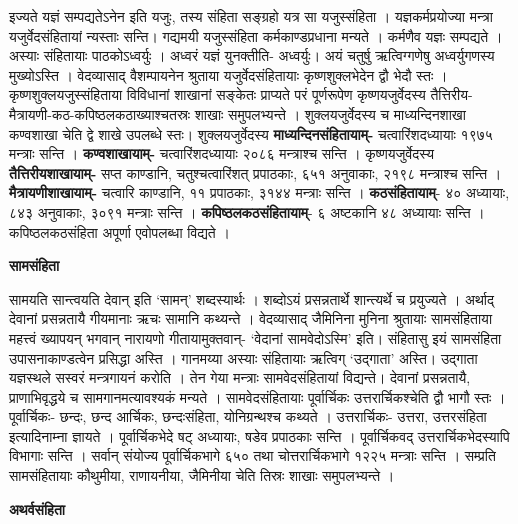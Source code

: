 \documentclass[11pt, a5paper]{article}
\newcommand{\customparagraph}[1]{
    \noindent \textbf{#1} \par
    \penalty 10000 %
    \vspace{0.1cm plus 0.05cm minus 0.02cm}
    \penalty 10000 %
}
\begin{document}
इज्यते यज्ञं सम्पद्यतेऽनेन इति यजुः, तस्य संहिता सङ्‌ग्रहो यत्र सा यजुस्संहिता । यज्ञकर्मप्रयोज्या मन्त्रा यजुर्वेदसंहितायां न्यस्ताः सन्ति। गद्यमयी यजुस्संहिता कर्मकाण्डप्रधाना मन्यते । कर्मणैव यज्ञः सम्पद्यते । अस्याः संहितायाः पाठकोऽध्वर्युः । अध्वरं यज्ञं युनक्तीति- अध्वर्युः। अयं चतुर्षु ऋत्विग्गणेषु अध्वर्युगणस्य मुख्योऽस्ति । वेदव्यासाद् वैशम्पायनेन श्रुताया यजुर्वेदसंहितायाः कृष्णशुक्लभेदेन द्वौ भेदौ स्तः । कृष्णशुक्लयजुस्संहिताया विविधानां शाखानां सङ्केतः प्राप्यते परं पूर्णरूपेण कृष्णयजुर्वेदस्य तैत्तिरीय-मैत्रायणी-कठ-कपिष्ठलकठाख्याश्चतस्रः शाखाः समुपलभ्यन्ते । शुक्लयजुर्वेदस्य च माध्यन्दिनशाखा कण्वशाखा चेति द्वे शाखे उपलब्धे स्तः।  शुक्लयजुर्वेदस्य \textbf{माध्यन्दिनसंहितायाम्-} चत्वारिंशदध्यायाः १९७५ मन्त्राः सन्ति । \textbf{कण्वशाखायाम्-} चत्वारिंशदध्यायाः २०८६ मन्त्राश्च सन्ति । कृष्णयजुर्वेदस्य \textbf{तैत्तिरीयशाखायाम्-} सप्त काण्डानि, चतुश्चत्वारिंशत् प्रपाठकाः, ६५१ अनुवाकाः, २१९८ मन्त्राश्च सन्ति । \textbf{मैत्रायणीशाखायाम्-} चत्वारि काण्डानि, ११ प्रपाठकाः, ३१४४ मन्त्राः सन्ति । \textbf{कठसंहितायाम्}- ४० अध्यायाः, ८४३ अनुवाकाः, ३०९१ मन्त्राः सन्ति । \textbf{कपिष्ठलकठसंहितायाम्}- ६ अष्टकानि ४८ अध्यायाः सन्ति । कपिष्ठलकठसंहिता अपूर्णा एवोपलब्धा विद्यते ।

\customparagraph{\textbf{सामसंहिता}}

सामयति सान्त्वयति देवान् इति ‘सामन्’ शब्दस्यार्थः । शब्दोऽयं प्रसन्नतार्थे शान्त्यर्थे च प्रयुज्यते । अर्थाद् देवानां प्रसन्नतायै गीयमानाः ऋचः सामानि कथ्यन्ते । वेदव्यासाद् जैमिनिना मुनिना श्रुतायाः सामसंहिताया महत्त्वं ख्यापयन् भगवान् नारायणो गीतायामुक्तवान्- ‘वेदानां सामवेदोऽस्मि’ इति। संहितासु इयं सामसंहिता उपासनाकाण्डत्वेन प्रसिद्धा अस्ति । गानमय्या अस्याः संहितायाः ऋत्विग् ‘उद्गाता’ अस्ति। उद्गाता यज्ञस्थले सस्वरं मन्त्रगायनं करोति । तेन गेया मन्त्राः सामवेदसंहितायां विद्यन्ते। देवानां प्रसन्नतायै, प्राणाभिवृद्धये च सामगानमत्यावश्यकं मन्यते । सामवेदसंहितायाः  पूर्वार्चिकः उत्तरार्चिकश्चेति द्वौ भागौ स्तः । पूर्वार्चिकः- छन्दः, छन्द आर्चिकः, छन्दःसंहिता, योनिग्रन्थश्च कथ्यते । उत्तरार्चिकः- उत्तरा, उत्तरसंहिता इत्यादिनाम्ना ज्ञायते । पूर्वार्चिकभेदे षट् अध्यायाः, षडेव प्रपाठकाः सन्ति । पूर्वार्चिकवद् उत्तरार्चिकभेदस्यापि विभागाः सन्ति । सर्वान् संयोज्य पूर्वार्चिकभागे ६५० तथा चोत्तरार्चिकभागे १२२५ मन्त्राः सन्ति । सम्प्रति सामसंहितायाः कौथुमीया, राणायनीया, जैमिनीया चेति तिस्रः शाखाः समुपलभ्यन्ते ।

\customparagraph{\textbf{अथर्वसंहिता}}
\end{document}
